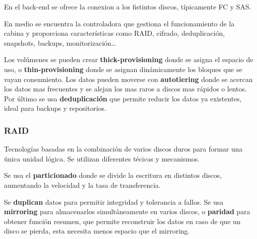             En el back-end se ofrece la conexion a los fistintos discos, típicamente FC y SAS.

            En medio se encuentra la controladora que gestiona el funcionamiento de la cabina y proporciona características como RAID, cifrado, deduplicación, snapshots, backups, monitorización\dots

            Los volúmenes se pueden crear \textbf{thick-provisioning} donde se asigna el espacio de uso, o \textbf{thin-provisioning} donde se asignan dinámicamente los bloques que se vayan consumiento. Los datos pueden moverse con \textbf{autotiering} donde se acercan los datos mas frecuentes y se alejan los mas raros a discos mas rápidos o lentos. Por último se usa \textbf{deduplicación} que permite reducir los datos ya existentes, ideal para backups y repositorios.
    \subsubsection{RAID}
        Tecnologías basadas en la combinación de varios discos duros para formar una única unidad lógica. Se utilizan diferentes técicas y mecanismos.

        Se usa el \textbf{particionado} donde se divide la escritura en distintos discos, aumentando la velocidad y la tasa de transferencia.

        Se \textbf{duplican} datos para permitir integridad y tolerancia a fallos. Se usa \textbf{mirroring} para almacenarlos simultáneamente en varios discos, o \textbf{paridad} para obtener función resumen, que permite reconstruir los datos en caso de que un disco se pierda, esta necesita menos espacio que el mirroring.

